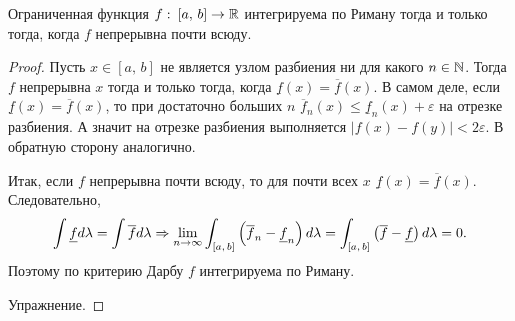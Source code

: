 \begin{theorem}
    Ограниченная функция $f:\: [a,\, b]\to\mathbb{R}$ интегрируема по Риману тогда и только тогда,
    когда $f$ непрерывна почти всюду.

    \begin{proof}

        \circled{$\Leftarrow$} Пусть $x\in [a,\, b]$ не является узлом разбиения
        ни для какого $n\in \mathbb{N}$. Тогда $f$ непрерывна $x$ тогда и только тогда, когда
        $\underline{f}(x)=\overline{f}(x)$. В самом деле, если
        $\underline{f}(x)=\overline{f}(x)$, то при достаточно больших $n$
        $\overline{f}_n(x)\leqslant\underline{f}_n(x)+\varepsilon$
        на отрезке разбиения. А значит на отрезке разбиения выполняется $|f(x)-f(y)|<2\varepsilon$.
        В обратную сторону аналогично.

        Итак, если $f$ непрерывна почти всюду, то для почти всех $x$ $\underline{f}(x)=\overline{f}(x)$.
        Следовательно, \[
            \int \underline{f}d\lambda=\int\overline{f}d\lambda\Rightarrow
            \lim_{n\to\infty}\int_{[a,\, b]}\left(\overline{f}_n-\underline{f}_n\right)d\lambda=
            \int_{[a,\, b]}\left(\overline{f}-\underline{f}\right)d\lambda=0.
        \]
        Поэтому по критерию Дарбу $f$ интегрируема по Риману.

        \circled{$\Rightarrow$} Упражнение.

    \end{proof}
\end{theorem}

